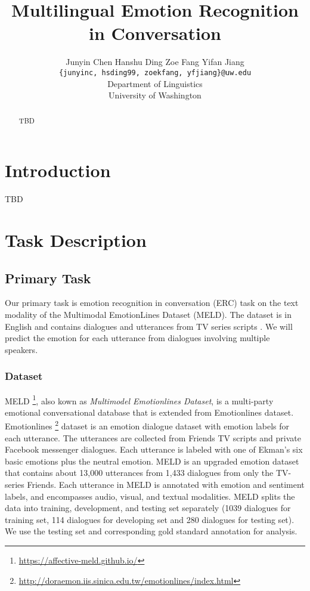 \documentclass[11pt]{article}
\title{Multilingual Emotion Recognition in Conversation}
\author{Junyin Chen {} {} {} Hanshu Ding {} {} {} Zoe Fang {} {} {} Yifan Jiang \\
		\texttt{\{junyinc, hsding99, zoekfang, yfjiang\}@uw.edu} \\
        Department of Linguistics \\ University of Washington}
\begin{document}
\maketitle
\begin{abstract}
  TBD
\end{abstract}

\section{Introduction}
TBD

\section{Task Description}

\subsection{Primary Task}
\label{sect:primary_task}

Our primary task is emotion recognition in conversation (ERC) task on the text modality of the Multimodal EmotionLines Dataset (MELD). The dataset is in English and contains dialogues and utterances from TV series scripts . We will predict the emotion for each utterance from dialogues involving multiple speakers.

\subsubsection{Dataset}

MELD\citep{poria-etal-2019-meld} \footnote{\url{https://affective-meld.github.io/}}, also kown as \textit{Multimodel Emotionlines Dataset}, is a multi-party emotional conversational database that is extended from Emotionlines dataset. 
Emotionlines \citep{hsu-etal-2018-emotionlines}\footnote{\url{http://doraemon.iis.sinica.edu.tw/emotionlines/index.html}} dataset is an emotion dialogue dataset with emotion labels for each utterance. The utterances are collected from Friends TV scripts and private Facebook messenger dialogues. Each utterance is labeled with one of Ekman’s six basic emotions plus the neutral emotion. MELD is an upgraded emotion dataset that contains about 13,000 utterances from 1,433 dialogues from only the TV-series Friends. Each utterance in MELD is annotated with emotion and sentiment labels, and encompasses audio, visual, and textual modalities. 
MELD splits the data into training, development, and testing set separately (1039 dialogues for training set, 114 dialogues for developing set and 280 dialogues for testing set). We use the testing set and corresponding gold standard annotation for analysis.
\end{document}
